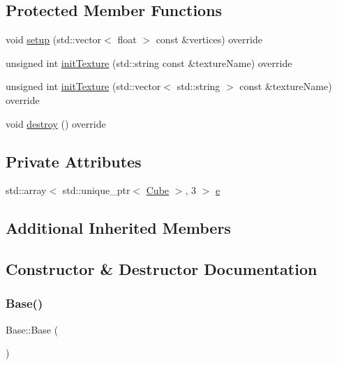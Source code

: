 \subsection*{Protected Member Functions}
\begin{DoxyCompactItemize}
\item 
void \hyperlink{classBase_a57945f86e82faccbd6147f355ed17407}{setup} (std\+::vector$<$ float $>$ const \&vertices) override
\item 
unsigned int \hyperlink{classBase_ae1e3b63d1e2d374e1dc49a9160717cfe}{init\+Texture} (std\+::string const \&texture\+Name) override
\item 
unsigned int \hyperlink{classBase_ae8bcd2edd2c191d58109502792a067ab}{init\+Texture} (std\+::vector$<$ std\+::string $>$ const \&texture\+Name) override
\item 
void \hyperlink{classBase_ac547253cd64e7bc7e4a675eaa4e880b7}{destroy} () override
\end{DoxyCompactItemize}
\subsection*{Private Attributes}
\begin{DoxyCompactItemize}
\item 
std\+::array$<$ std\+::unique\+\_\+ptr$<$ \hyperlink{classCube}{Cube} $>$, 3 $>$ \hyperlink{classBase_a1637c5b4562fa8c6eab5563ee089f948}{e}
\end{DoxyCompactItemize}
\subsection*{Additional Inherited Members}


\subsection{Constructor \& Destructor Documentation}
\mbox{\label{classBase_a5ffe0568374d8b9b4c4ec32953fd6453}} 
\subsubsection{\texorpdfstring{Base()}{Base()}}
{\footnotesize\ttfamily Base\+::\+Base (\begin{DoxyParamCaption}{ }\end{DoxyParamCaption})}

\mbox{\label{classBase_a722da881b6c70cfcbde9243abcfbf334}} 
